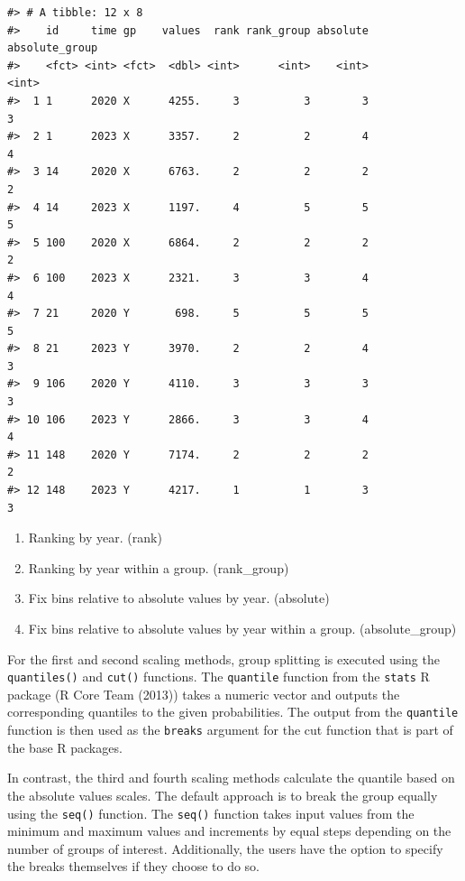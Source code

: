 \begin{verbatim}
#> # A tibble: 12 x 8
#>    id     time gp    values  rank rank_group absolute absolute_group
#>    <fct> <int> <fct>  <dbl> <int>      <int>    <int>          <int>
#>  1 1      2020 X      4255.     3          3        3              3
#>  2 1      2023 X      3357.     2          2        4              4
#>  3 14     2020 X      6763.     2          2        2              2
#>  4 14     2023 X      1197.     4          5        5              5
#>  5 100    2020 X      6864.     2          2        2              2
#>  6 100    2023 X      2321.     3          3        4              4
#>  7 21     2020 Y       698.     5          5        5              5
#>  8 21     2023 Y      3970.     2          2        4              3
#>  9 106    2020 Y      4110.     3          3        3              3
#> 10 106    2023 Y      2866.     3          3        4              4
#> 11 148    2020 Y      7174.     2          2        2              2
#> 12 148    2023 Y      4217.     1          1        3              3
\end{verbatim}

\begin{enumerate}
\def\labelenumi{\arabic{enumi}.}
\tightlist
\item
  Ranking by year. (rank)
\item
  Ranking by year within a group. (rank\_group)
\item
  Fix bins relative to absolute values by year. (absolute)
\item
  Fix bins relative to absolute values by year within a group. (absolute\_group)
\end{enumerate}

For the first and second scaling methods, group splitting is executed using the \texttt{quantiles()} and \texttt{cut()} functions. The \texttt{quantile} function from the \texttt{stats} R package (R Core Team (2013)) takes a numeric vector and outputs the corresponding quantiles to the given probabilities. The output from the \texttt{quantile} function is then used as the \texttt{breaks} argument for the cut function that is part of the base R packages.

In contrast, the third and fourth scaling methods calculate the quantile based on the absolute values scales. The default approach is to break the group equally using the \texttt{seq()} function. The \texttt{seq()} function takes input values from the minimum and maximum values and increments by equal steps depending on the number of groups of interest. Additionally, the users have the option to specify the breaks themselves if they choose to do so.

